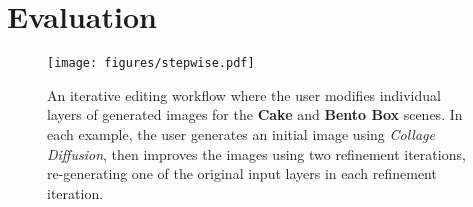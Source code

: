 \vspace{-0.5em}
\section{Evaluation}
\vspace{-0.5em}

\begin{figure}
    \texttt{[image: figures/stepwise.pdf]}
    \caption{An iterative editing workflow where the user modifies individual layers of generated images for the \textbf{Cake} and \textbf{Bento Box} scenes. In each example, the user generates an initial image using \textit{Collage Diffusion}, then improves the images using two refinement iterations, re-generating one of the original input layers in each refinement iteration. }
    \label{fig:stepwise}
\end{figure}

